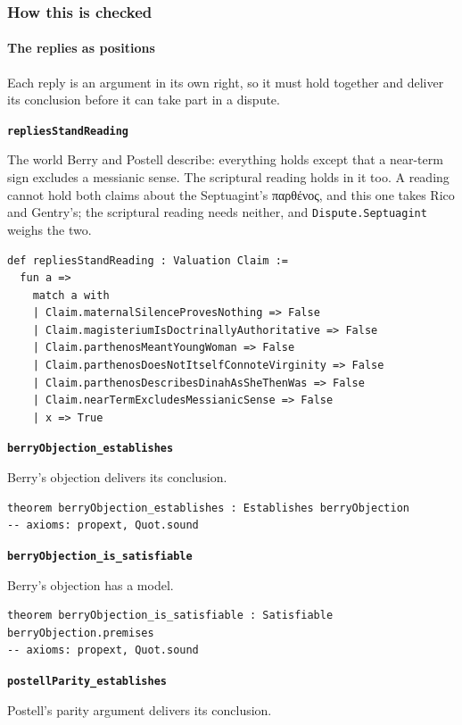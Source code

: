 \documentclass[11pt]{article}
\begin{document}
\subsubsection*{How this is checked}
\paragraph*{The replies as positions}
\leavevmode\par\nobreak
Each reply is an argument in its own right, so it must hold together and deliver its conclusion before it can take part in a dispute.

\par\medskip\noindent\textbf{\texttt{replies\allowbreak{}Stand\allowbreak{}Reading}}\par\nobreak\noindent
The world Berry and Postell describe: everything holds except that a near-term sign excludes a messianic sense. The scriptural reading holds in it too. A reading cannot hold both claims about the Septuagint’s παρθένος, and this one takes Rico and Gentry’s; the scriptural reading needs neither, and \texttt{Dispute.Septuagint} weighs the two.

{\small\begin{verbatim}
def repliesStandReading : Valuation Claim :=
  fun a =>
    match a with
    | Claim.maternalSilenceProvesNothing => False
    | Claim.magisteriumIsDoctrinallyAuthoritative => False
    | Claim.parthenosMeantYoungWoman => False
    | Claim.parthenosDoesNotItselfConnoteVirginity => False
    | Claim.parthenosDescribesDinahAsSheThenWas => False
    | Claim.nearTermExcludesMessianicSense => False
    | x => True
\end{verbatim}}
\par\medskip\noindent\textbf{\texttt{berry\allowbreak{}Objection\_\allowbreak{}establishes}}\par\nobreak\noindent
Berry’s objection delivers its conclusion.

{\small\begin{verbatim}
theorem berryObjection_establishes : Establishes berryObjection
-- axioms: propext, Quot.sound
\end{verbatim}}
\par\medskip\noindent\textbf{\texttt{berry\allowbreak{}Objection\_\allowbreak{}is\_\allowbreak{}satisfiable}}\par\nobreak\noindent
Berry’s objection has a model.

{\small\begin{verbatim}
theorem berryObjection_is_satisfiable : Satisfiable berryObjection.premises
-- axioms: propext, Quot.sound
\end{verbatim}}
\par\medskip\noindent\textbf{\texttt{postell\allowbreak{}Parity\_\allowbreak{}establishes}}\par\nobreak\noindent
Postell’s parity argument delivers its conclusion.
\end{document}
